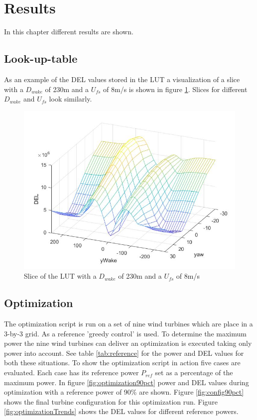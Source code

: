 \section{Results}

In this chapter different results are shown.

\subsection{Look-up-table}
As an example of the DEL values stored in the LUT a visualization of a slice with a $D_{wake}$ of 230m and a $U_{fs}$ of 8m/s is shown in figure \ref{fig:LUTslice}. Slices for different $D_{wake}$ and $U_{fs}$ look similarly.

\begin{figure}
	\includegraphics[width=\linewidth]{./Figures/LUTslice_Dw230_Ufs8.jpg}
	\caption{Slice of the LUT with a $D_{wake}$ of 230m and a $U_{fs}$ of 8m/s }
	\label{fig:LUTslice}
\end{figure}

\subsection{Optimization}
The optimization script is run on a set of nine wind turbines which are place in a 3-by-3 grid. As a reference 'greedy control' is used. To determine the maximum power the nine wind turbines can deliver an optimization is executed taking only power into account. See table \ref{tab:reference} for the power and DEL values for both these situations. \newline
To show the optimization script in action five cases are evaluated. Each case has its reference power $P_{ref}$ set as a percentage of the maximum power. In figure \ref{fig:optimization90pct} power and DEL values during optimization with a reference power of 90\% are shown. Figure \ref{fig:config90pct} shows the final turbine configuration for this optimization run. \newline
Figure \ref{fig:optimizationTrends} shows the DEL values for different reference powers.


